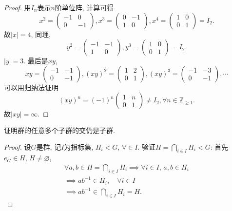 \begin{proof}
    用$I_n$表示$n$阶单位阵, 计算可得
    \[
        x^2 = \begin{pmatrix}
            -1 & 0 \\
            0 & -1
        \end{pmatrix},
        x^3 = \begin{pmatrix}
            0 & -1 \\
            1 & 0
        \end{pmatrix},
        x^4 = \begin{pmatrix}
            1 & 0 \\
            0 & 1
        \end{pmatrix} = I_2.
    \]
    故$|x| = 4$, 同理,
    \[
        y^2 = \begin{pmatrix}
            -1 & -1 \\
            1 & 0
        \end{pmatrix},
        y^3 = \begin{pmatrix}
            1 & 0 \\
            0 & 1
        \end{pmatrix} = I_2.
    \]
    $|y| = 3$. 最后是$xy$,
    \[
        xy = \begin{pmatrix}
            -1 & -1 \\
            0 & -1
        \end{pmatrix},
        (xy)^2 = \begin{pmatrix}
            1 & 2 \\
            0 & 1
        \end{pmatrix},
        (xy)^3 = \begin{pmatrix}
            -1 & -3 \\
            0 & -1
        \end{pmatrix}, \cdots
    \]
    可以用归纳法证明
    \[
        (xy)^n = (-1)^n
        \begin{pmatrix}
            1 & n \\
            0 & 1
        \end{pmatrix}
        \neq I_2, \forall n \in \mathbb{Z}_{\geqslant 1}.
    \]
    故$|xy| = \infty$.
\end{proof}
    
\begin{problem}\label{ex:1.3.12}
    证明群的任意多个子群的交仍是子群.
\end{problem}

\begin{proof}
    设$G$是群, 记$I$为指标集, $H_i < G,\, \forall \in I$. 验证\(H = \displaystyle\bigcap_{i \in I} H_i < G\): 首先$e_G \in H$, $H \neq \varnothing$,
    \[
    \begin{gathered}
        \forall a, b \in H = \bigcap_{i \in I} H_i \implies \forall i \in I,\,a, b \in H_i\\
        \implies ab^{-1} \in H_i, \quad \forall i \in I\\
        \implies ab^{-1} \in \bigcap_{i \in I} H_i = H.
    \end{gathered}
    \]
\end{proof}

